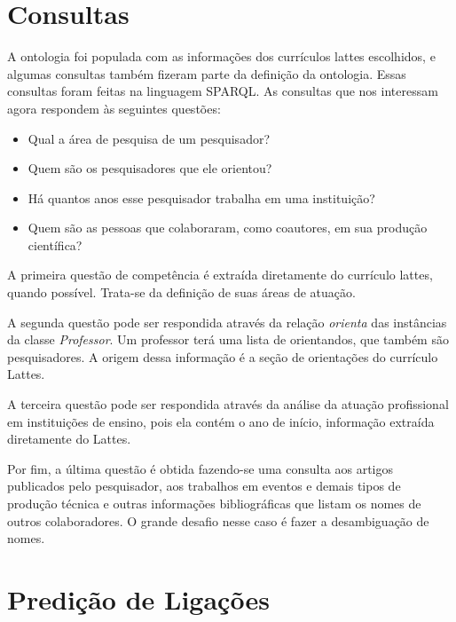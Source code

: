 \section{Consultas}
\label{sec:desenvolvimento-consultas}

A ontologia foi populada com as informações dos currículos lattes escolhidos, e algumas consultas também fizeram parte da definição da ontologia. Essas consultas foram feitas na linguagem SPARQL. As consultas que nos interessam agora respondem às seguintes questões:

\begin{itemize}
    \item Qual a área de pesquisa de um pesquisador?
    \item Quem são os pesquisadores que ele orientou?
    \item Há quantos anos esse pesquisador trabalha em uma instituição?
    \item Quem são as pessoas que colaboraram, como coautores, em sua produção científica?
\end{itemize}

A primeira questão de competência é extraída diretamente do currículo lattes, quando possível. Trata-se da definição de suas áreas de atuação.

A segunda questão pode ser respondida através da relação \textit{orienta} das instâncias da classe \textit{Professor}. Um professor terá uma lista de orientandos, que também são pesquisadores. A origem dessa informação é a seção de orientações do currículo Lattes.

A terceira questão pode ser respondida através da análise da atuação profissional em instituições de ensino, pois ela contém o ano de início, informação extraída diretamente do Lattes.

Por fim, a última questão é obtida fazendo-se uma consulta aos artigos publicados pelo pesquisador, aos trabalhos em eventos e demais tipos de produção técnica e outras informações bibliográficas que listam os nomes de outros colaboradores. O grande desafio nesse caso é fazer a desambiguação de nomes.

\section{Predição de Ligações}
\label{sec:desenvolvimento-predicao}


